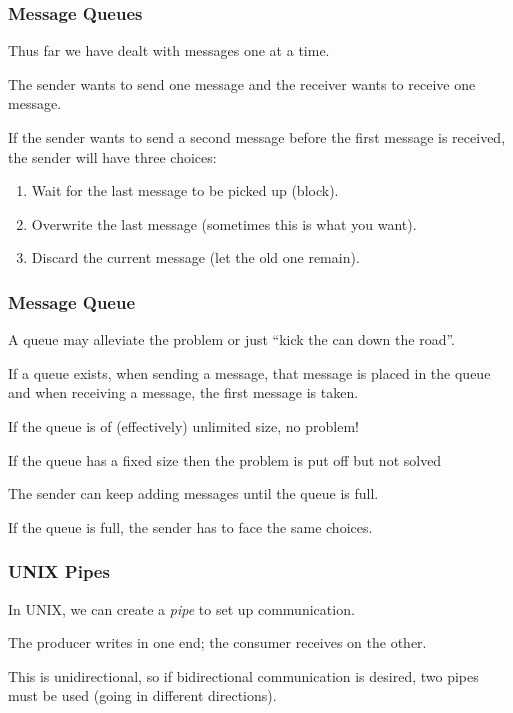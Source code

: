 \begin{frame}
\frametitle{Message Queues}

Thus far we have dealt with messages one at a time.

The sender wants to send one message and the receiver wants to receive one message. 

If the sender wants to send a second message before the first message is received, the sender will have three choices:

\begin{enumerate}
	\item Wait for the last message to be picked up (block).
	\item Overwrite the last message (sometimes this is what you want).
	\item Discard the current message (let the old one remain).
\end{enumerate}


\end{frame}

\begin{frame}
\frametitle{Message Queue}

A queue may alleviate the problem or just ``kick the can down the road''.

  If a queue exists, when sending a message, that message is placed in the queue and when receiving a message, the first message is taken. 
  
 If the queue is of (effectively) unlimited size, no problem!
 
 If the queue has a fixed size then the problem is put off but not solved 
 
 The sender can keep adding messages until the queue is full. 
 
 If the queue is full, the sender has to face the same choices.

\end{frame}

\begin{frame}
\frametitle{UNIX Pipes}

In UNIX, we can create a \textit{pipe} to set up communication. 

The producer writes in one end; the consumer receives on the other. 

This is unidirectional, so if bidirectional communication is desired, two pipes must be used (going in different directions). 

\end{frame}

